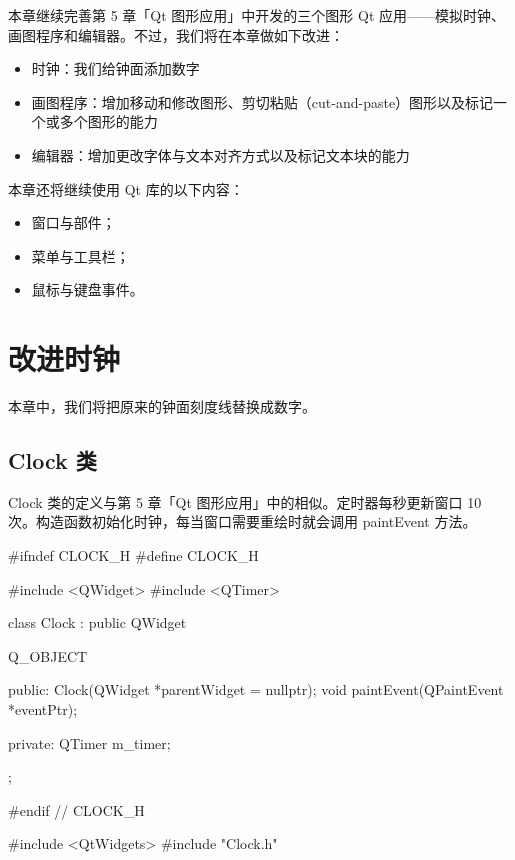 \renewcommand{\codeInset}{63bp}
本章继续完善第 5 章「Qt 图形应用」中开发的三个图形 Qt 应用——模拟时钟、画图程序和编辑器。不过，我们将在本章做如下改进：

\begin{itemize}
\item 时钟：我们给钟面添加数字
\item 画图程序：增加移动和修改图形、剪切粘贴（cut-and-paste）图形以及标记一个或多个图形的能力
\item 编辑器：增加更改字体与文本对齐方式以及标记文本块的能力
\end{itemize}

本章还将继续使用 Qt 库的以下内容：

\begin{itemize}
\item 窗口与部件；
\item 菜单与工具栏；
\item 鼠标与键盘事件。
\end{itemize}

\section{改进时钟}

本章中，我们将把原来的钟面刻度线替换成数字。

\subsection{Clock 类}

Clock 类的定义与第 5 章「Qt 图形应用」中的相似。定时器每秒更新窗口 10 次。构造函数初始化时钟，每当窗口需要重绘时就会调用 paintEvent 方法。

\medskip{}

\begin{codebox}
#ifndef CLOCK_H
#define CLOCK_H

#include <QWidget>
#include <QTimer>

class Clock : public QWidget {
  Q_OBJECT

  public:
    Clock(QWidget *parentWidget = nullptr);
    void paintEvent(QPaintEvent *eventPtr);

  private:
    QTimer m_timer;
};

#endif // CLOCK_H
\end{codebox}

\medskip{}

\begin{codebox}
#include <QtWidgets>
#include "Clock.h"
\end{codebox}

